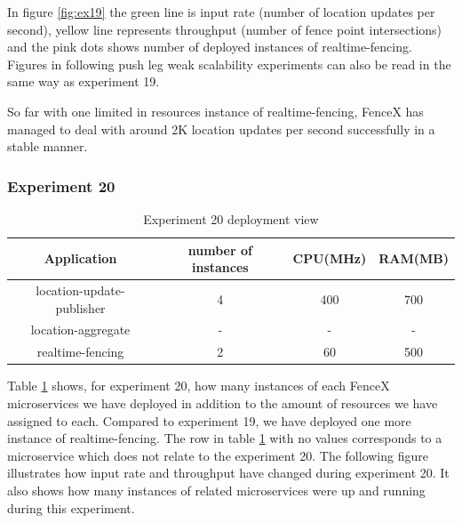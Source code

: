 \documentclass[a4]{report}
\begin{document}
    In figure \ref{fig:ex19} the green line is input rate (number of location updates per second),
    yellow line represents throughput (number of fence point intersections) and the pink dots shows number of
    deployed instances of realtime-fencing.
    Figures in following push leg weak scalability experiments can also be read in the same way as experiment 19.

    So far with one limited in resources instance of realtime-fencing, FenceX has managed to deal with around 2K
    location updates per second successfully in a stable manner.

    \clearpage

    \subsubsection{Experiment 20}
    \begin{table}[h!]
        \centering
        \begin{tabular}{|c|c|c|c|}
            \hline
            Application               & number of instances & CPU(MHz) & RAM(MB) \\
            \hline
            location-update-publisher & 4                   & 400      & 700     \\
            location-aggregate        & -                   & -        & -       \\
            realtime-fencing          & 2                   & 60       & 500     \\
            \hline
        \end{tabular}
        \caption{Experiment 20 deployment view}
        \label{table:ex20-dv}
    \end{table}

    Table \ref{table:ex20-dv} shows, for experiment 20, how many instances of each FenceX microservices we have
    deployed in addition to the amount of resources we have assigned to each.
    Compared to experiment 19, we have deployed one more instance of realtime-fencing.
    The row in table \ref{table:ex20-dv} with no values corresponds to a microservice which does not relate to the
    experiment 20.
    The following figure illustrates how input rate and throughput have changed during experiment 20.
    It also shows how many instances of related microservices were up and running during this experiment.
\end{document}
